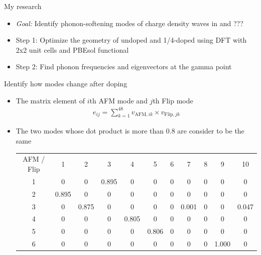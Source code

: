 \documentclass{beamer}
\begin{document}
\begin{frame}{My research}
\begin{itemize}
\item \textit{Goal:} Identify phonon-softening modes of charge density waves in  and ???
\item Step 1: Optimize the geometry of undoped and 1/4-doped  using DFT with 2x2 unit cells and PBEsol functional
\item Step 2: Find phonon frequencies and eigenvectors at the gamma point
\end{itemize}
\end{frame}

\begin{frame}{Identify how modes change after doping}
\begin{itemize}
\item The matrix element of $i$th AFM mode and $j$th Flip mode
\begin{align}
e_{ij} = \sum_{k = 1}^{48} v_{\text{AFM}, ik} \times v_{\text{Flip}, jk}
\end{align}
\item The two modes whose dot product is more than 0.8 are consider to be the same
\begin{table}
\begin{tabular}{ccccccccccc}
AFM / Flip & 1 & 2 & 3 & 4 & 5 & 6 & 7 & 8 & 9 & 10 \\
1 & 0 & 0 & 0.895 & 0 & 0 & 0 & 0 & 0 & 0 & 0 \\
2 & 0.895 & 0 & 0 & 0 & 0 & 0 & 0 & 0 & 0 & 0 \\
3 & 0 & 0.875 & 0 & 0 & 0 & 0 & 0.001 & 0 & 0 & 0.047 \\
4 & 0 & 0 & 0 & 0.805 & 0 & 0 & 0 & 0 & 0 & 0 \\
5 & 0 & 0 & 0 & 0 & 0.806 & 0 & 0 & 0 & 0 & 0 \\
6 & 0 & 0 & 0 & 0 & 0 & 0 & 0 & 0 & 1.000 & 0 \\
\end{tabular}
\end{table}
\end{itemize}
\end{frame}
\end{document}
